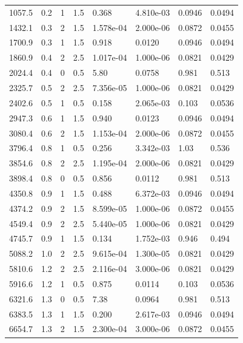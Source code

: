 \documentclass[preview]{standalone}
\begin{document}
{{\begin{tabular}{L{1.2cm}C{1.2cm} C{0.3cm}C{0.5cm} C{1.4cm}C{1.4cm} C{1.4cm}C{1.4cm}}
  1057.5  &   0.2  & 1     & 1.5 &  0.368  & 4.810e-03  & 0.0946 &  0.0494   \\ 
  1432.1  &   0.3  & 2     & 1.5 &  1.578e-04  & 2.000e-06  & 0.0872 &  0.0455   \\ 
  1700.9  &   0.3  & 1     & 1.5 &  0.918  & 0.0120  & 0.0946 &  0.0494   \\ 
  1860.9  &   0.4  & 2     & 2.5 &  1.017e-04  & 1.000e-06  & 0.0821 &  0.0429   \\ 
  2024.4  &   0.4  & 0     & 0.5 &  5.80  & 0.0758  & 0.981 &  0.513   \\ 
  2325.7  &   0.5  & 2     & 2.5 &  7.356e-05  & 1.000e-06  & 0.0821 &  0.0429   \\ 
  2402.6  &   0.5  & 1     & 0.5 &  0.158  & 2.065e-03  & 0.103 &  0.0536   \\ 
  2947.3  &   0.6  & 1     & 1.5 &  0.940  & 0.0123  & 0.0946 &  0.0494   \\ 
  3080.4  &   0.6  & 2     & 1.5 &  1.153e-04  & 2.000e-06  & 0.0872 &  0.0455   \\ 
  3796.4  &   0.8  & 1     & 0.5 &  0.256  & 3.342e-03  & 1.03 &  0.536   \\ 
  3854.6  &   0.8  & 2     & 2.5 &  1.195e-04  & 2.000e-06  & 0.0821 &  0.0429   \\ 
  3898.4  &   0.8  & 0     & 0.5 &  0.856  & 0.0112  & 0.981 &  0.513   \\ 
  4350.8  &   0.9  & 1     & 1.5 &  0.488  & 6.372e-03  & 0.0946 &  0.0494   \\ 
  4374.2  &   0.9  & 2     & 1.5 &  8.599e-05  & 1.000e-06  & 0.0872 &  0.0455   \\ 
  4549.4  &   0.9  & 2     & 2.5 &  5.440e-05  & 1.000e-06  & 0.0821 &  0.0429   \\ 
  4745.7  &   0.9  & 1     & 1.5 &  0.134  & 1.752e-03  & 0.946 &  0.494   \\ 
  5088.2  &   1.0  & 2     & 2.5 &  9.615e-04  & 1.300e-05  & 0.0821 &  0.0429   \\ 
  5810.6  &   1.2  & 2     & 2.5 &  2.116e-04  & 3.000e-06  & 0.0821 &  0.0429   \\ 
  5916.6  &   1.2  & 1     & 0.5 &  0.875  & 0.0114  & 0.103 &  0.0536   \\ 
  6321.6  &   1.3  & 0     & 0.5 &  7.38  & 0.0964  & 0.981 &  0.513   \\ 
  6383.5  &   1.3  & 1     & 1.5 &  0.200  & 2.617e-03  & 0.0946 &  0.0494   \\ 
  6654.7  &   1.3  & 2     & 1.5 &  2.300e-04  & 3.000e-06  & 0.0872 &  0.0455   \\ 

\end{tabular}}}
\end{document}
